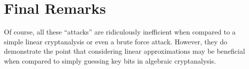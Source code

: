 \section{Final Remarks}
Of course, all these ``attacks'' are ridiculously inefficient when compared to a simple linear cryptanalysis or even a brute force attack. However, they do demonstrate the point that considering linear approximations may be beneficial when compared to simply guessing key bits in algebraic cryptanalysis.